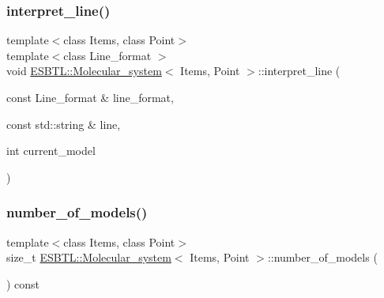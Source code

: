 \mbox{\label{classESBTL_1_1Molecular__system_a86cda10618aa2fd1730786fc4145acb2}} 
\subsubsection{\texorpdfstring{interpret\+\_\+line()}{interpret\_line()}}
{\footnotesize\ttfamily template$<$class Items, class Point$>$ \\
template$<$class Line\+\_\+format $>$ \\
void \hyperlink{classESBTL_1_1Molecular__system}{E\+S\+B\+T\+L\+::\+Molecular\+\_\+system}$<$ Items, Point $>$\+::interpret\+\_\+line (\begin{DoxyParamCaption}\item[{const Line\+\_\+format \&}]{line\+\_\+format,  }\item[{const std\+::string \&}]{line,  }\item[{int}]{current\+\_\+model }\end{DoxyParamCaption})\hspace{0.3cm}{\ttfamily [inline]}}

\mbox{\label{classESBTL_1_1Molecular__system_aa2dc1f2843ca6c182f50386502ec95e5}} 
\subsubsection{\texorpdfstring{number\+\_\+of\+\_\+models()}{number\_of\_models()}}
{\footnotesize\ttfamily template$<$class Items, class Point$>$ \\
size\+\_\+t \hyperlink{classESBTL_1_1Molecular__system}{E\+S\+B\+T\+L\+::\+Molecular\+\_\+system}$<$ Items, Point $>$\+::number\+\_\+of\+\_\+models (\begin{DoxyParamCaption}{ }\end{DoxyParamCaption}) const\hspace{0.3cm}{\ttfamily [inline]}}

